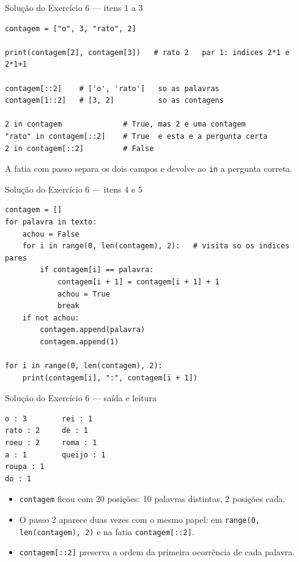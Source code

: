\documentclass[aspectratio=169]{beamer}
\begin{document}
\begin{frame}[fragile]{Solução do Exercício 6 --- itens 1 a 3}
\begin{lstlisting}
contagem = ["o", 3, "rato", 2]

print(contagem[2], contagem[3])   # rato 2   par 1: indices 2*1 e 2*1+1

contagem[::2]    # ['o', 'rato']   so as palavras
contagem[1::2]   # [3, 2]          so as contagens

2 in contagem              # True, mas 2 e uma contagem
"rato" in contagem[::2]    # True  e esta e a pergunta certa
2 in contagem[::2]         # False
\end{lstlisting}

A fatia com passo separa os dois campos e devolve ao \texttt{in} a pergunta correta.
\end{frame}

\begin{frame}[fragile]{Solução do Exercício 6 --- itens 4 e 5}
\begin{lstlisting}
contagem = []
for palavra in texto:
    achou = False
    for i in range(0, len(contagem), 2):   # visita so os indices pares
        if contagem[i] == palavra:
            contagem[i + 1] = contagem[i + 1] + 1
            achou = True
            break
    if not achou:
        contagem.append(palavra)
        contagem.append(1)

for i in range(0, len(contagem), 2):
    print(contagem[i], ":", contagem[i + 1])
\end{lstlisting}
\end{frame}

\begin{frame}[fragile]{Solução do Exercício 6 --- saída e leitura}
\begin{lstlisting}[style=terminal]
o : 3        rei : 1
rato : 2     de : 1
roeu : 2     roma : 1
a : 1        queijo : 1
roupa : 1
do : 1
\end{lstlisting}

\begin{itemize}
  \item \texttt{contagem} ficou com 20 posições: 10 palavras distintas, 2 posições cada.
  \item O passo 2 aparece duas vezes com o mesmo papel: em \texttt{range(0, len(contagem), 2)} e na fatia \texttt{contagem[::2]}.
  \item \texttt{contagem[::2]} preserva a ordem da primeira ocorrência de cada palavra.
\end{itemize}
\end{frame}
\end{document}
